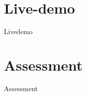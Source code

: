 \documentclass[aspectratio=169]{beamer}
\begin{document}
\section{Live-demo}
\begin{frame}{Livedemo}
\end{frame}

\section{Assessment}
\begin{frame}{Assessment}
\end{frame}
\end{document}
